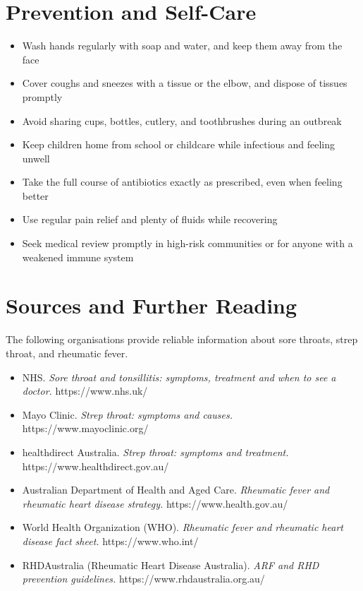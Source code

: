 \section*{Prevention and Self-Care}
\begin{itemize}
    \item Wash hands regularly with soap and water, and keep them away from the face
    \item Cover coughs and sneezes with a tissue or the elbow, and dispose of tissues promptly
    \item Avoid sharing cups, bottles, cutlery, and toothbrushes during an outbreak
    \item Keep children home from school or childcare while infectious and feeling unwell
    \item Take the full course of antibiotics exactly as prescribed, even when feeling better
    \item Use regular pain relief and plenty of fluids while recovering
    \item Seek medical review promptly in high-risk communities or for anyone with a weakened immune system
\end{itemize}

\section*{Sources and Further Reading}
The following organisations provide reliable information about sore throats, strep throat, and rheumatic fever.

\begin{itemize}
    \item NHS. \textit{Sore throat and tonsillitis: symptoms, treatment and when to see a doctor.} https://www.nhs.uk/
    \item Mayo Clinic. \textit{Strep throat: symptoms and causes.} https://www.mayoclinic.org/
    \item healthdirect Australia. \textit{Strep throat: symptoms and treatment.} https://www.healthdirect.gov.au/
    \item Australian Department of Health and Aged Care. \textit{Rheumatic fever and rheumatic heart disease strategy.} https://www.health.gov.au/
    \item World Health Organization (WHO). \textit{Rheumatic fever and rheumatic heart disease fact sheet.} https://www.who.int/
    \item RHDAustralia (Rheumatic Heart Disease Australia). \textit{ARF and RHD prevention guidelines.} https://www.rhdaustralia.org.au/
\end{itemize}

\clearpage
